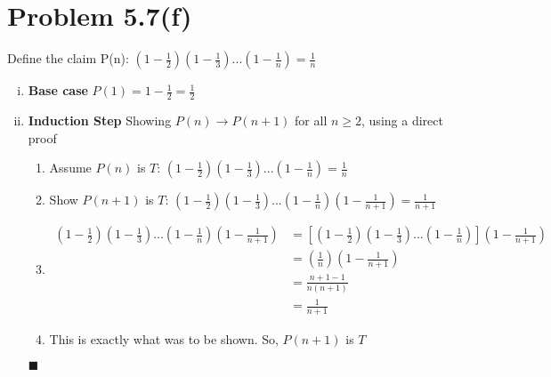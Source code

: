 \documentclass{article}
\def\math#1{$#1$}
\begin{document}
\section{Problem 5.7(f)}
Define the claim P(n): \math{(1 - \frac{1}{2})(1 - \frac{1}{3})...(1 - \frac{1}{n}) = \frac{1}{n}}

\begin{enumerate}[i)]
    \item \textbf{Base case} \math{P(1) = 1 - \frac{1}{2} = \frac{1}{2}}
    \item \textbf{Induction Step} Showing \math{P(n) \to P(n+1)} for all \math{n \geq 2}, using a direct proof
    \begin{enumerate}[(1)]
        \item Assume \math{P(n)} is \math{T}: \math{(1 - \frac{1}{2})(1 - \frac{1}{3})...(1 - \frac{1}{n}) = \frac{1}{n}}
        \item Show \math{P(n+1)} is \math{T}: \math{(1 - \frac{1}{2})(1 - \frac{1}{3})...(1 - \frac{1}{n})(1 - \frac{1}{n+1}) = \frac{1}{n+1}}
        \item 
            \begin{equation}
                \begin{split}
                    (1 - \frac{1}{2})(1 - \frac{1}{3})...(1 - \frac{1}{n})(1 - \frac{1}{n+1}) & = [(1 - \frac{1}{2})(1 - \frac{1}{3})...(1 - \frac{1}{n})](1 - \frac{1}{n+1}) \\
                    & = (\frac{1}{n})(1 - \frac{1}{n+1}) \\
                    & = \frac{n + 1 - 1}{n(n+1)} \\
                    &= \frac{1}{n+1}
                \end{split}
            \end{equation}
        \item This is exactly what was to be shown. So, \math{P(n+1)} is \math{T}
    \end{enumerate}
     \hfill{\math{\blacksquare}}
\end{enumerate}
\end{document}
